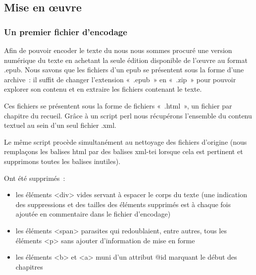 \documentclass[12pt, a4paper]{article}
\begin{document}
    \subsection{Mise en œuvre}


\subsubsection{Un premier fichier d'encodage}
\label{premier_enc}
Afin de pouvoir encoder le texte du \punr{} nous nous sommes procuré une version numérique du texte en achetant la seule édition disponible de l'œuvre au format \go.epub\gf. Nous savons que les fichiers d'un epub se présentent sous la forme d'une archive~: il suffit de changer l'extension «~.epub~» en «~.zip~» pour pouvoir explorer son contenu et en extraire les fichiers contenant le texte.

Ces fichiers se présentent sous la forme de fichiers «~.html~», un fichier par chapitre du recueil. Grâce à un script perl nous récupérons l'ensemble du contenu textuel au sein d'un seul fichier .xml.

Le même script procède simultanément au nettoyage des fichiers d'origine (nous remplaçons les balises html par des balises xml-tei lorsque cela est pertinent et supprimons toutes les balises inutiles).

Ont été supprimés~:
\begin{itemize}
    \item les éléments <div> vides servant à espacer le corps du texte (une indication des suppressions et des tailles des éléments supprimés est à chaque fois ajoutée en commentaire dans le fichier d'encodage)
    \item les éléments <span> parasites qui redoublaient, entre autres, tous les éléments <p> sans ajouter d'information de mise en forme
    \item les éléments <b> et <a> muni d'un attribut @id marquant le début des chapitres
\end{itemize}
\end{document}
